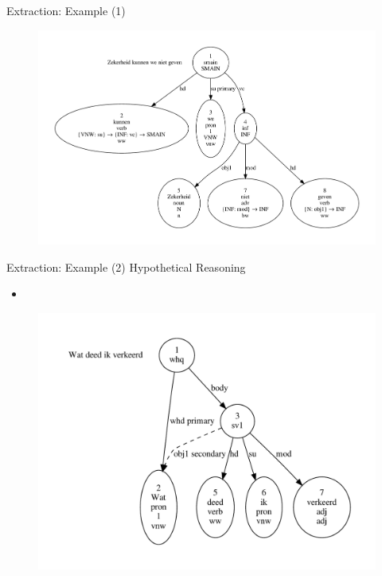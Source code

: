 \documentclass{beamer}
\begin{document}
{
\begin{frame}{Extraction: Example (1)}
\begin{figure}
\includegraphics[scale=0.38]{zekerheid2.pdf}
\end{figure}
\end{frame}
}

{
\begin{frame}{Extraction: Example (2)}
\alert{Hypothetical Reasoning}
\begin{itemize}
\item[] \color{black}{When type assigning arguments, consider internal ``gaps''}
\end{itemize}

\begin{figure}
\includegraphics[scale=0.5]{deed.pdf}
\end{figure}
\end{frame}
}
\end{document}
